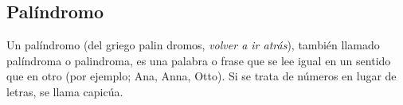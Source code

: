 \subsection{Palíndromo}
Un palíndromo (del griego palin dromos, \emph{volver a ir atrás}), también llamado palíndroma o palindroma, es una palabra o frase que se lee igual en un sentido que en otro (por ejemplo; Ana, Anna, Otto). Si se trata de números en lugar de letras, se llama capicúa. 

